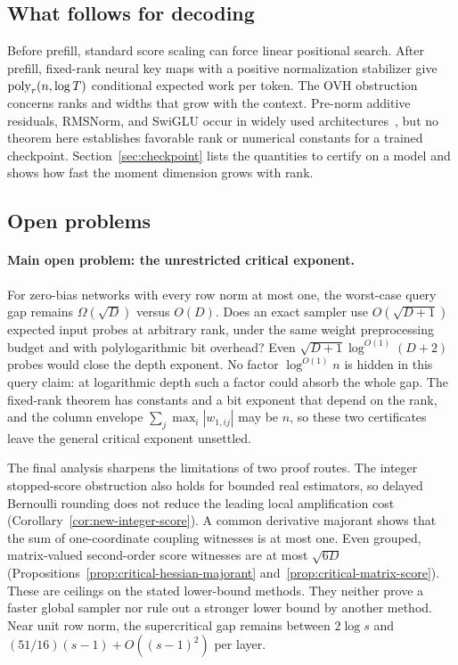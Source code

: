 \subsection{What follows for decoding}

Before prefill, standard score scaling can force linear positional
search. After prefill, fixed-rank neural key maps with a positive
normalization stabilizer give $\operatorname{poly}_r(n,\log T)$ conditional expected
work per token. The OVH obstruction concerns ranks and widths that
grow with the context. Pre-norm additive residuals, RMSNorm, and
SwiGLU occur in widely used
architectures~\cite{touvron2023llama2,zhang2019rmsnorm,shazeer2020glu},
but no theorem here establishes favorable rank or numerical constants
for a trained checkpoint. Section~\ref{sec:checkpoint} lists the
quantities to certify on a model and shows how fast the moment
dimension grows with rank.

\subsection{Open problems}

\paragraph{Main open problem: the unrestricted critical exponent.}
For zero-bias networks with every row norm at most one, the worst-case
query gap remains $\Omega(\sqrt D)$ versus $O(D)$. Does an exact
sampler use $O(\sqrt{D+1})$ expected input probes at arbitrary rank,
under the same weight preprocessing budget and with polylogarithmic
bit overhead? Even $\sqrt{D+1}\log^{O(1)}(D+2)$ probes would close
the depth exponent. No factor $\log^{O(1)}n$ is hidden in this query
claim: at logarithmic depth such a factor could absorb the whole gap.
The fixed-rank theorem has constants and a bit exponent that depend
on the rank, and the column envelope $\sum_j\max_i|w_{1,ij}|$ may be
$n$, so these two certificates leave the general critical exponent
unsettled.

The final analysis sharpens the limitations of two proof routes.
The integer stopped-score obstruction also holds for bounded real
estimators, so delayed Bernoulli rounding does not reduce the leading
local amplification cost (Corollary~\ref{cor:new-integer-score}).
A common derivative majorant shows that the
sum of one-coordinate coupling witnesses is at most one. Even grouped,
matrix-valued second-order score witnesses are at most $\sqrt{6D}$
(Propositions~\ref{prop:critical-hessian-majorant}
and~\ref{prop:critical-matrix-score}). These are ceilings on the stated
lower-bound methods. They neither prove a faster global sampler nor
rule out a stronger lower bound by another method.
Near unit row norm, the supercritical gap remains between
$2\log s$ and $(51/16)(s-1)+O((s-1)^2)$ per layer.

